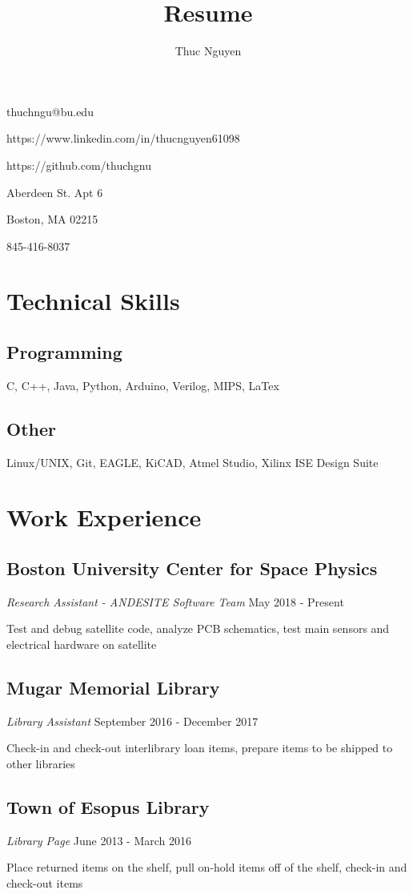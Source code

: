 \documentclass{article}
\makeatletter
\renewcommand{\maketitle}
{\begin{center}
{\huge\bfseries\theauthor}
\vspace{.5em}

thuchngu@bu.edu

https://www.linkedin.com/in/thucnguyen61098

https://github.com/thuchgnu

\end{center}}
\makeatother
\begin{document}
\title{Resume}
\author{Thuc Nguyen}
\maketitle
\vspace{-.5em}
{ Aberdeen St. Apt 6

Boston, MA 02215

845-416-8037

}

\vspace{.5em}
\section{Technical Skills}
\subsection{Programming}
C, C++, Java, Python, Arduino, Verilog, MIPS, LaTex
\subsection{Other}
Linux/UNIX, Git, EAGLE, KiCAD, Atmel Studio, Xilinx ISE Design Suite

\section{Work Experience}
\subsection{Boston University Center for Space Physics}  \textit{Research Assistant - ANDESITE Software Team}
May 2018 - Present

Test and debug satellite code, analyze PCB schematics, test main sensors and electrical hardware on satellite
\subsection{Mugar Memorial Library} \textit{Library Assistant}
September 2016 - December 2017

Check-in and check-out interlibrary loan items, prepare items to be shipped to other libraries
\subsection{Town of Esopus Library} \textit{Library Page}
June 2013 - March 2016

Place returned items on the shelf, pull on-hold items off of the shelf, check-in and check-out items
\end{document}
